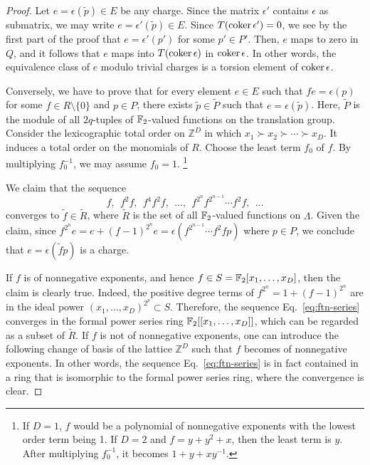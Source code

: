 \begin{proof}
Let $e = \epsilon( \tilde p ) \in E$ be any charge.
Since the matrix $\epsilon'$ contains $\epsilon$ as submatrix,
we may write $e = \epsilon'(\tilde p) \in E$.
Since $T(\mathop{\mathrm{coker}}\nolimits \epsilon')=0$,
we see by the first part of the proof that $e = \epsilon'( p' )$ for some $p' \in P'$.
Then, $e$ maps to zero in $Q$, and it follows that $e$ maps into $T(\mathop{\mathrm{coker}}\nolimits \epsilon)$
in $\mathop{\mathrm{coker}}\nolimits \epsilon$. 
In other words, the equivalence class of $e$ modulo trivial charges 
is a torsion element of $\mathop{\mathrm{coker}}\nolimits \epsilon$.

Conversely,
we have to prove that for every element $e \in E$ 
such that $fe = \epsilon(p)$ for some $f \in R \setminus \{0\}$ and $p \in P$,
there exists $\tilde p \in \tilde P$ such that $ e = \epsilon( \tilde p )$.
Here, $\tilde P$ is the module of all $2q$-tuples of 
$\mathbb{F}_2$-valued functions on the translation group.
Consider the lexicographic total order on $\mathbb{Z}^D$ in which $x_1 \succ x_2 \succ \cdots \succ x_D$.
It induces a total order on the monomials of $R$.
Choose the least term $f_0$ of $f$.
By multiplying $f_0^{-1}$, we may assume $f_0 = 1$.%
\footnote{
If $D=1$, $f$ would be a polynomial of nonnegative exponents with the lowest order term being 1.
If $D=2$ and $f = y + y^2 + x$, then the least term is $y$.
After multiplying $f_0^{-1}$, it becomes $1+y+xy^{-1}$.
}

We claim that the sequence
\begin{equation}
 f,\ \  f^2 f,\ \  f^4 f^2 f,\ \  \ldots,\ \  f^{2^n}f^{2^{n-1}} \cdots f^2 f,\ \  \ldots
\label{eq:ftn-series}
\end{equation}
converges to $\tilde f \in \tilde R$,
where $\tilde R$ is the set of all $\mathbb{F}_2$-valued functions on $\Lambda$.
Given the claim,
since $f^{2^n} e = e + (f-1)^{2^n}e = \epsilon(f^{2^{n-1}} \cdots f^2 f p)$ where $p \in P$,
we conclude that $e = \epsilon( \tilde f p )$ is a charge.

If $f$ is of nonnegative exponents, and hence $f \in S=\mathbb{F}_2[x_1,\ldots,x_D]$,
then the claim is clearly true.
Indeed, the positive degree terms of $f^{2^n} = 1 + (f-1)^{2^n}$ 
are in the ideal power $(x_1,\ldots,x_D)^{2^p} \subset S$.
Therefore, the sequence Eq.~\eqref{eq:ftn-series} converges
in the formal power series ring $\mathbb{F}_2[[x_1,\ldots,x_D]]$,
which can be regarded as a subset of $\tilde R$.
If $f$ is not of nonnegative exponents, one can introduce the following change of basis
of the lattice $\mathbb{Z}^D$ such that $f$ becomes of nonnegative exponents.
In other words, the sequence Eq.~\eqref{eq:ftn-series} is in fact contained in a ring 
that is isomorphic to the formal power series ring, where the convergence is clear.


\end{proof}
